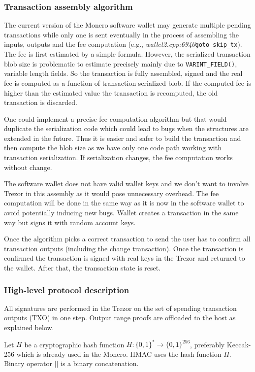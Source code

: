 \documentclass[]{article}
\begin{document}
\subsubsection{Transaction assembly algorithm}

The current version of the Monero software wallet may generate multiple pending transactions while only one is sent eventually in the process of assembling the inputs, outputs and the fee computation (e.g., \emph{wallet2.cpp:6940}\;\verb|goto skip_tx|). The fee is first estimated by a simple formula. However, the serialized transaction blob size is problematic to estimate precisely mainly due to \verb|VARINT_FIELD()|, variable length fields. So the transaction is fully assembled, signed and the real fee is computed as a function of transaction serialized blob. If the computed fee is higher than the  estimated value the transaction is recomputed, the old transaction is discarded. 

One could implement a precise fee computation algorithm but that would duplicate the serialization code which could lead to bugs when the structures are extended in the future. Thus it is easier and safer to build the transaction and then compute the blob size as we have only one code path working with transaction serialization. If serialization changes, the fee computation works without change. 

The software wallet does not have valid wallet keys and we don't want to involve Trezor in this assembly as it would pose unnecessary overhead. The fee computation will be done in the same way as it is now in the software wallet to avoid potentially inducing new bugs. Wallet creates a transaction in the same way but signs it with random account keys. 

Once the algorithm picks a correct transaction to send the user has to confirm all transaction outputs (including the change transaction). Once the transaction is confirmed the transaction is signed with real keys in the Trezor and returned to the wallet. After that, the transaction state is reset.


\subsubsection{High-level protocol description} 
All signatures are performed in the Trezor on the set of spending transaction outputs (TXO) in one step. Output range proofs are offloaded to the host as explained below.

Let $H$ be a cryptographic hash function $H : \{0,1\}^* \rightarrow \{0,1\}^{256}$, preferably Keccak-256 which is already used in the Monero. HMAC uses the hash function $H$. Binary operator $||$ is a binary concatenation.
\end{document}
